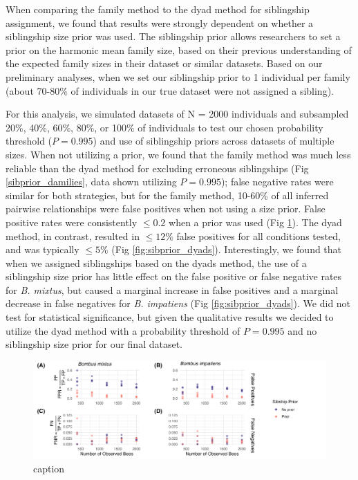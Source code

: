\documentclass[12pt]{article}
\begin{document}
When comparing the family method to the dyad method for siblingship assignment, we found that results were strongly dependent on whether a siblingship size prior was used. The siblingship prior allows researchers to set a prior on the harmonic mean family size, based on their previous understanding of the expected family sizes in their dataset or similar datasets. Based on our preliminary analyses, when we set our siblingship prior to 1 individual per family (about 70-80\% of individuals in our true dataset were not assigned a sibling).

For this analysis, we simulated datasets of N = 2000 individuals and subsampled 20\%, 40\%, 60\%, 80\%, or 100\% of individuals to test our chosen probability threshold ($P = 0.995$) and use of siblingship priors across datasets of multiple sizes. When not utilizing a prior, we found that the family method was much less reliable than the dyad method for excluding erroneous siblingships (Fig \ref{sibprior_damilies}, data shown utilizing $P = 0.995$); false negative rates were similar for both strategies, but for the family method, 10-60\% of all inferred pairwise relationships were false positives when not using a size prior. False positive rates were consistently $\le 0.2$ when a prior was used (Fig \ref{fig:sibprior_families}). The dyad method, in contrast, resulted in $\le 12\%$ false positives for all conditions tested, and was typically $\le 5\%$ (Fig \ref{fig:sibprior_dyads}). Interestingly, we found that when we assigned siblingships based on the dyads method, the use of a siblingship size prior has little effect on the false positive or false negative rates for \emph{B. mixtus}, but caused a marginal increase in false positives and a marginal decrease in false negatives for \emph{B. impatiens} (Fig \ref{fig:sibprior_dyads}). We did not test for statistical significance, but given the qualitative results we decided to utilize the dyad method with a probability threshold of $P = 0.995$ and no siblingship size prior for our final dataset. 

\begin{figure}[H]
    \centering
    \includegraphics[width=\linewidth]{appendix_figures/sibprior_families.jpg}
    \caption{caption}
    \label{fig:sibprior_families}
\end{figure}
\end{document}
